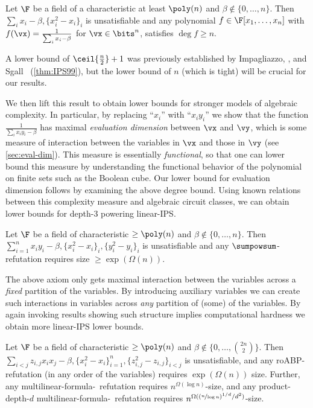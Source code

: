 \documentclass{toc}
\begin{document}
\begin{theorem}
        Let $\F$ be a field of a characteristic at least $\poly(n)$ and $\beta\notin\{0,\ldots,n\}$. Then $\sum_i x_i-\beta,\{x_i^2-x_i\}_i$ is unsatisfiable and any polynomial $f\in\F[x_1,\ldots,x_n]$ with $f(\vx)=\frac{1}{\sum_i x_i-\beta}$ for $\vx\in\bits^n$, satisfies $\deg f\ge n$.
\end{theorem}

A lower bound of $\ceil{\frac{n}{2}}+1$ was previously established by Impagliazzo, \Pudlak, and Sgall~\cite{IPS99} (\autoref{thm:IPS99}), but the lower bound of $n$ (which is tight) will be crucial for our results.

We then lift this result to obtain lower bounds for stronger models of algebraic complexity. In particular, by replacing ``$x_i$'' with ``$x_iy_i$'' we show that the function $\frac{1}{\sum_i x_iy_i-\beta}$ has maximal \emph{evaluation dimension} between $\vx$ and $\vy$, which is some measure of interaction between the variables in $\vx$ and those in $\vy$ (see \autoref{sec:eval-dim}).  This measure is essentially \emph{functional}, so that one can lower bound this measure by understanding the functional behavior of the polynomial on finite sets such as the Boolean cube. Our lower bound for evaluation dimension follows by examining the above degree bound. Using known relations between this complexity measure and algebraic circuit classes, we can obtain lower bounds for depth-3 powering linear-IPS.

\begin{theorem}
        Let $\F$ be a field of characteristic $\ge\poly(n)$ and $\beta\notin\{0,\ldots,n\}$.  Then $\sum_{i=1}^n x_iy_i-\beta,\{x_i^2-x_i\}_i,\{y_i^2-y_i\}_i$ is unsatisfiable and any $\sumpowsum$-\lIPS refutation requires size $\ge\exp(\Omega(n))$.
\end{theorem}

The above axiom only gets maximal interaction between the variables across a \emph{fixed} partition of the variables.  By introducing auxiliary variables we can create such interactions in variables across \emph{any} partition of (some) of the variables.  By again invoking results showing such structure implies computational hardness we obtain more linear-IPS lower bounds.

\begin{theorem}
  Let $\F$ be a field of characteristic $\ge\poly(n)$ and $\beta\notin\{0,\ldots,\binom{2n}{2}\}$. Then $\sum_{i<j} z_{i,j}x_ix_j-\beta,\{x_i^2-x_i\}_{i=1}^n,\{z_{i,j}^2-z_{i,j}\}_{i<j}$ is unsatisfiable, and any roABP-\lIPS refutation (in any order of the variables)
requires $\exp(\Omega(n))$ size.
Further, any multilinear-formula-\IPS\ refutation requires $n^{\Omega(\log n)}$-size, and any product-depth-$d$ multilinear-formula-\IPS\ refutation requires $n^{\Omega((\nicefrac{n}{\log n})^{1/d}/d^2)}$-size.
\end{theorem}
\end{document}
